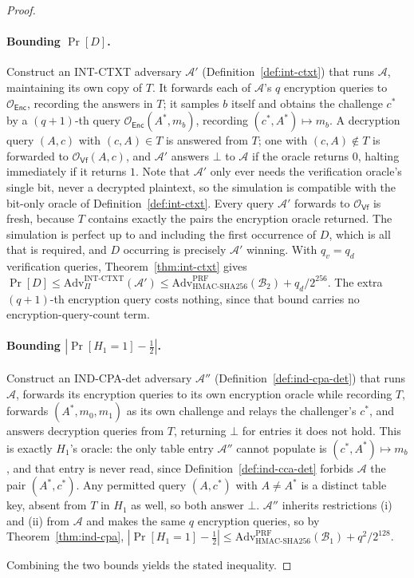\documentclass[11pt,a4paper]{article}
\begin{document}
\begin{proof}
\paragraph{Bounding $\Pr[D]$.} Construct an INT-CTXT adversary
$\mathcal{A}'$ (Definition~\ref{def:int-ctxt}) that runs $\mathcal{A}$,
maintaining its own copy of $T$. It forwards each of $\mathcal{A}$'s $q$
encryption queries to $\mathcal{O}_{\mathsf{Enc}}$, recording the answers in
$T$; it samples $b$ itself and obtains the challenge $c^*$ by a
$(q{+}1)$-th query $\mathcal{O}_{\mathsf{Enc}}(A^*,m_b)$, recording
$(c^*,A^*)\mapsto m_b$. A decryption query $(A,c)$ with $(c,A)\in T$ is
answered from $T$; one with $(c,A)\notin T$ is forwarded to
$\mathcal{O}_{\mathsf{Vf}}(A,c)$, and $\mathcal{A}'$ answers $\bot$ to
$\mathcal{A}$ if the oracle returns $0$, halting immediately if it returns
$1$. Note that $\mathcal{A}'$ only ever needs the verification oracle's
single bit, never a decrypted plaintext, so the simulation is compatible
with the bit-only oracle of Definition~\ref{def:int-ctxt}. Every query
$\mathcal{A}'$ forwards to $\mathcal{O}_{\mathsf{Vf}}$ is fresh, because
$T$ contains exactly the pairs the encryption oracle returned. The
simulation is perfect up to and including the first occurrence of $D$,
which is all that is required, and $D$ occurring is precisely
$\mathcal{A}'$ winning. With $q_v=q_d$ verification queries,
Theorem~\ref{thm:int-ctxt} gives
$\Pr[D]\le\mathrm{Adv}^{\mathrm{INT\text{-}CTXT}}_{\Pi}(\mathcal{A}')
\le\mathrm{Adv}^{\mathrm{PRF}}_{\mathrm{HMAC\text{-}SHA256}}(\mathcal{B}_2)+q_d/2^{256}$.
The extra $(q{+}1)$-th encryption query costs nothing, since that bound
carries no encryption-query-count term.

\paragraph{Bounding $|\Pr[H_1{=}1]-\tfrac12|$.} Construct an IND-CPA-det
adversary $\mathcal{A}''$ (Definition~\ref{def:ind-cpa-det}) that runs
$\mathcal{A}$, forwards its encryption queries to its own encryption
oracle while recording $T$, forwards $(A^*,m_0,m_1)$ as its own challenge
and relays the challenger's $c^*$, and answers decryption queries from $T$,
returning $\bot$ for entries it does not hold. This is exactly $H_1$'s
oracle: the only table entry $\mathcal{A}''$ cannot populate is
$(c^*,A^*)\mapsto m_b$, and that entry is never read, since
Definition~\ref{def:ind-cca-det} forbids $\mathcal{A}$ the pair
$(A^*,c^*)$. Any permitted query $(A,c^*)$ with $A\neq A^*$ is a distinct
table key, absent from $T$ in $H_1$ as well, so both answer $\bot$.
$\mathcal{A}''$ inherits restrictions (i) and (ii) from $\mathcal{A}$ and
makes the same $q$ encryption queries, so by
Theorem~\ref{thm:ind-cpa},
$|\Pr[H_1{=}1]-\tfrac12|
\le\mathrm{Adv}^{\mathrm{PRF}}_{\mathrm{HMAC\text{-}SHA256}}(\mathcal{B}_1)+q^2/2^{128}$.

Combining the two bounds yields the stated inequality.
\end{proof}
\end{document}
